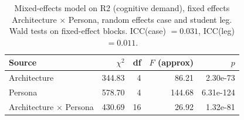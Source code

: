 \begin{table}[htbp]
\centering
\caption{Mixed-effects model on R2 (cognitive demand), fixed effects Architecture $\times$ Persona, random effects case and student leg. Wald tests on fixed-effect blocks. ICC(case) $= 0.031$, ICC(leg) $= 0.011$.}
\label{tab:anova-R2}
\begin{tabular}{lrrrr}
\toprule
Source & $\chi^2$ & df & $F$ (approx) & $p$ \\
\midrule
Architecture & 344.83 & 4 & 86.21 & 2.30e-73 \\
Persona & 578.70 & 4 & 144.68 & 6.31e-124 \\
Architecture $\times$ Persona & 430.69 & 16 & 26.92 & 1.32e-81 \\
\bottomrule
\end{tabular}
\end{table}
